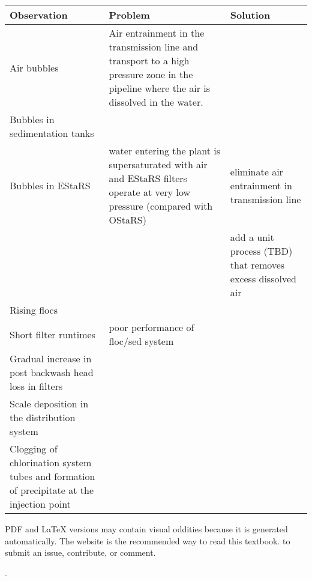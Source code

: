 \documentclass[letterpaper,10pt,english]{sphinxmanual}
\begin{document}
\begin{savenotes}\sphinxattablestart
\raggedright
{}
\label{\detokenize{Troubleshooting/Troubleshooting:id1}}\label{\detokenize{Troubleshooting/Troubleshooting:table-troubleshooting}}
\sphinxaftercaption
\begin{tabulary}{\linewidth}[t]{|T|T|T|}
\hline
\sphinxstyletheadfamily 
Observation
&\sphinxstyletheadfamily 
Problem
&\sphinxstyletheadfamily 
Solution
\\
\hline
Air bubbles
&
Air entrainment in the transmission line and transport to a high pressure zone in the pipeline where the air is dissolved in the water.
&\\
\hline
Bubbles in sedimentation tanks
&&\\
\hline
Bubbles in EStaRS
&
water entering the plant is supersaturated with air and EStaRS filters operate at very low pressure (compared with OStaRS)
&
eliminate air entrainment in transmission line
\\
\hline&&
add a unit process (TBD) that removes excess dissolved air
\\
\hline
Rising flocs
&&\\
\hline
Short filter runtimes
&
poor performance of floc/sed system
&\\
\hline
Gradual increase in post backwash head loss in filters
&&\\
\hline
Scale deposition in the distribution system
&&\\
\hline
Clogging of chlorination system tubes and formation of precipitate at the injection point
&&\\
\hline
\end{tabulary}
\par
\sphinxattableend\end{savenotes}

\begin{footnote}[1]\sphinxAtStartFootnote
PDF and LaTeX versions may contain visual oddities because it is generated automatically. The website is the recommended way to read this textbook.  to submit an issue, contribute, or comment.
%
\end{footnote}.
\paragraph{}
\end{document}
